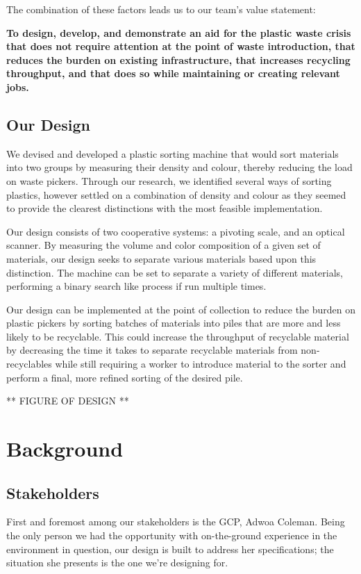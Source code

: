 \documentclass[12pt]{article}
\begin{document}
\begin{multicols*}{2}
            The combination of these factors leads us to our team's value statement:

            \textbf{To design, develop, and demonstrate an aid for the plastic waste crisis that does not require attention at the point of waste introduction, that reduces the burden on existing infrastructure, that increases recycling throughput, and that does so while maintaining or creating relevant jobs.}

        \subsection{Our Design}
            We devised and developed a plastic sorting machine that would sort materials into two groups by measuring their density and colour, thereby reducing the load on waste pickers. Through our research, we identified several ways of sorting plastics, however settled on a combination of density and colour as they seemed to provide the clearest distinctions \cite{gent2009recycling} \cite{safavi2010sorting} \cite{bruno2000automated} with the most feasible implementation. 
            
            Our design consists of two cooperative systems: a pivoting scale, and an optical scanner. By  measuring the volume and color composition of a given set of materials, our design seeks to separate various materials based upon this distinction. The machine can be set to separate a variety of different materials, performing a binary search like process if run multiple times.

            Our design can be implemented at the point of collection to reduce the burden on plastic pickers by sorting batches of materials into piles that are more and less likely to be recyclable. This could increase the throughput of recyclable material by decreasing the time it takes to separate recyclable materials from non-recyclables while still requiring a worker to introduce material to the sorter and perform a final, more refined sorting of the desired pile.

            ** FIGURE OF DESIGN **

    \section{Background}
        \subsection{Stakeholders}
            First and foremost among our stakeholders is the GCP, Adwoa Coleman. Being the only person we had the opportunity with on-the-ground experience in the environment in question, our design is built to address her specifications; the situation she presents is the one we're designing for.
            

\end{multicols*}
\end{document}
